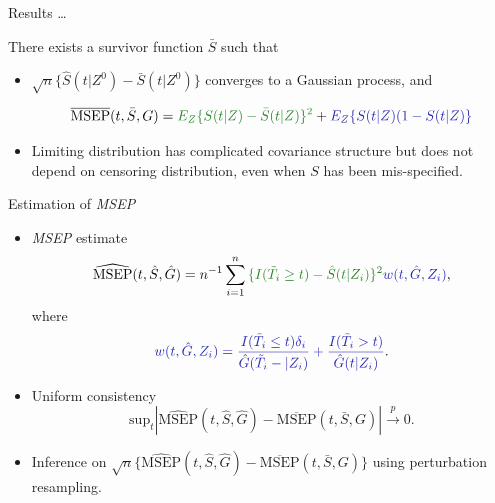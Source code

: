 \documentclass[11pt]{beamer}
\begin{document}
\begin{frame}{Results \ldots}


 There exists a survivor function $\bar{S}$ such that
 
 \begin{itemize}

 \item  $\sqrt{n} \{ \hat{S}(t | Z^0) - \bar{S}(t | Z^0) \}$
 converges to a Gaussian process, and

\begin{equation*}
\overline{\text{MSEP}}(t, \bar{S}, G) = 
\textcolor{forest}{E_{Z} \{S(t | Z) - \bar{S}(t|Z) \}^2} + 
\textcolor{darkblue}{E_Z \{ S(t|Z) (1 - S(t|Z) \}}
\end{equation*}

 \item Limiting distribution has complicated covariance structure but
 does  not  depend on censoring distribution, even when $S$
 has been mis-specified.

\end{itemize}
\end{frame}

\begin{frame}{Estimation of \textsl{MSEP}}

\begin{itemize}

\item \textsl{MSEP} estimate
\begin{equation*}
\widehat{\text{MSEP}}(t, \hat{S}, \hat{G}) = n^{-1}
\sum_{i=1}^n \textcolor{forest}{\{ I(\tilde{T}_i \geq t) - 
\hat{S}(t | Z_i) \}^2} \textcolor{darkblue}{w(t, \hat{G}, Z_i)},
\end{equation*}
where
\[
\textcolor{darkblue}{w(t, \hat{G}, Z_i) = \frac{I(\tilde{T}_i \leq t) 
\delta_i}{\hat{G}(\tilde{T}_i-|Z_i)} + 
\frac{I(\tilde{T}_i > t)}{\hat{G}(t|Z_i)}}.
\]

\item Uniform consistency
\begin{equation*}
\text{sup}_t | \widehat{\text{MSEP}}(t, \hat{S}, \hat{G}) 
     - \overline{\text{MSEP}}(t, \bar{S}, G) | \xrightarrow{p} 0.
\end{equation*}

\item Inference on $\sqrt{n} \{\widehat{\text{MSEP}}(t, \hat{S}, \hat{G}) -
\overline{\text{MSEP}}(t, \bar{S}, G) \}$ using perturbation resampling.

\end{itemize}
\end{frame}
\end{document}
